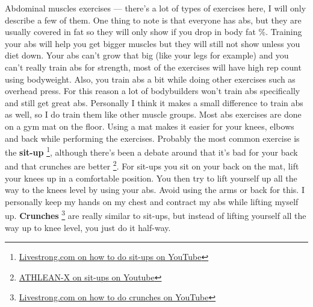 \documentclass[openany, 12pt]{book}
\begin{document}
        Abdominal muscles exercises
        ---
        there's a lot of types of exercises here, I will only describe a few of them. One thing to note is that everyone has abs, but they are usually covered in fat so they will only show if you drop
        in body fat \%. Training your abs will help you get bigger muscles but they will still not show unless you diet down.
        Your abs can't grow that big (like your legs for example) and you can't really train abs for strength, most of the exercises will have high rep count using bodyweight.
        Also, you train abs a bit while doing other exercises such as overhead press. For this reason a lot of bodybuilders won't train abs specifically and still get great abs.
        Personally I think it makes a small difference to train abs as well, so I do train them like other muscle groups.
        Most abs exercises are done on a gym mat on the floor. Using a mat makes it easier for your knees, elbows and back while performing the exercises.
        Probably the most common exercise is the \textbf{sit-up}
        \footnote{\href{https://www.youtube.com/watch?v=1fbU_MkV7NE}{Livestrong.com on how to do sit-ups on YouTube}}, although there's been a debate around that it's bad for your back and
        that crunches are better
        \footnote{\href{https://www.youtube.com/watch?v=y5BpvYGyVb0}{ATHLEAN-X on sit-ups on Youtube}}. For sit-ups you sit on your back on the mat, lift your knees up in a comfortable position.
        You then try to lift yourself up all the way to the knees level by using your abs. Avoid using the arms or back for this. I personally keep my hands on my chest and contract my abs
        while lifting myself up.
        \textbf{Crunches}
        \footnote{\href{https://www.youtube.com/watch?v=Xyd_fa5zoEU}{Livestrong.com on how to do crunches on YouTube}}
        are really similar to sit-ups, but instead of lifting yourself all the way up to knee level, you just do it half-way.
        
\end{document}
